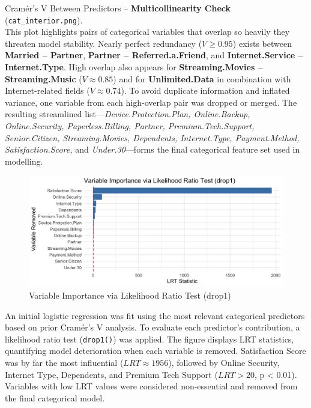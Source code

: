 \documentclass[
]{article}
\begin{document}
Cramér's V Between Predictors -- \textbf{Multicollinearity Check}
(\texttt{cat\_interior.png}).\\
This plot highlights pairs of categorical variables that overlap so
heavily they threaten model stability. Nearly perfect redundancy
(\(V \geq 0.95\)) exists between \textbf{Married -- Partner},
\textbf{Partner -- Referred.a.Friend}, and \textbf{Internet.Service --
Internet.Type}. High overlap also appears for \textbf{Streaming.Movies
-- Streaming.Music} (\(V \approx 0.85\)) and for \textbf{Unlimited.Data}
in combination with Internet-related fields (\(V \approx 0.74\)). To
avoid duplicate information and inflated variance, one variable from
each high-overlap pair was dropped or merged. The resulting streamlined
list---\emph{Device.Protection.Plan, Online.Backup, Online.Security,
Paperless.Billing, Partner, Premium.Tech.Support, Senior.Citizen,
Streaming.Movies, Dependents, Internet.Type, Payment.Method,
Satisfaction.Score,} and \emph{Under.30}---forms the final categorical
feature set used in modelling.

\begin{figure}

{\centering \includegraphics[width=0.85\linewidth]{glm_gam_plots/drop1_cat_glm} 

}

\caption{Variable Importance via Likelihood Ratio Test (drop1)}\label{fig:drop1-cat-glm-img}
\end{figure}

An initial logistic regression was fit using the most relevant
categorical predictors based on prior Cramér's V analysis. To evaluate
each predictor's contribution, a likelihood ratio test
(\texttt{drop1()}) was applied. The figure displays LRT statistics,
quantifying model deterioration when each variable is removed.
Satisfaction Score was by far the most influential
(\(LRT \approx 1956\)), followed by Online Security, Internet Type,
Dependents, and Premium Tech Support (\(LRT > 20\), p \textless{} 0.01).
Variables with low LRT values were considered non-essential and removed
from the final categorical model.
\end{document}

